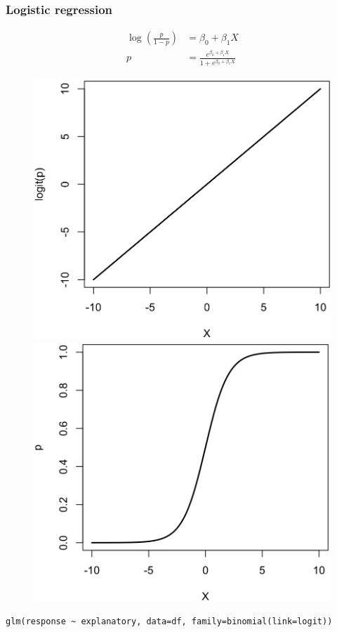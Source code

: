 \documentclass[pdf,handout]{beamer}
\begin{document}
\begin{frame}[fragile]
\frametitle{Logistic regression}

\scriptsize
$$
\begin{aligned}
\log\left(\frac{p}{1 - p}\right) &  = \beta_0 + \beta_1 X\\
p & = \frac{e^{\beta_0 + \beta_1 X}}{1 + e^{\beta_0 + \beta_1 X}}
\end{aligned}
$$

\normalsize
\vfill

\begin{figure}
\includegraphics[width=.4\textwidth]{logit.png}
\includegraphics[width=.4\textwidth]{invlogit.png}
\end{figure}

\begin{lstlisting}[style=R]
glm(response ~ explanatory, data=df, family=binomial(link=logit))
\end{lstlisting}

\end{frame}
\end{document}
